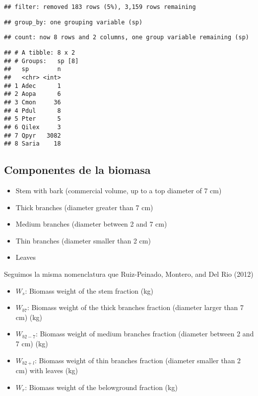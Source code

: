 \documentclass[]{article}
\newenvironment{Shaded}{\begin{snugshade}}{\end{snugshade}}
\newcommand{\KeywordTok}[1]{\textcolor[rgb]{0.13,0.29,0.53}{\textbf{#1}}}
\newcommand{\NormalTok}[1]{#1}
\newcommand{\OperatorTok}[1]{\textcolor[rgb]{0.81,0.36,0.00}{\textbf{#1}}}
\newcommand{\StringTok}[1]{\textcolor[rgb]{0.31,0.60,0.02}{#1}}
\providecommand{\tightlist}{%
  \setlength{\itemsep}{0pt}\setlength{\parskip}{0pt}}
\begin{document}
\begin{verbatim}
## filter: removed 183 rows (5%), 3,159 rows remaining
\end{verbatim}

\begin{Shaded}
\end{Shaded}

\begin{verbatim}
## group_by: one grouping variable (sp)
\end{verbatim}

\begin{verbatim}
## count: now 8 rows and 2 columns, one group variable remaining (sp)
\end{verbatim}

\begin{verbatim}
## # A tibble: 8 x 2
## # Groups:   sp [8]
##   sp        n
##   <chr> <int>
## 1 Adec      1
## 2 Aopa      6
## 3 Cmon     36
## 4 Pdul      8
## 5 Pter      5
## 6 Qilex     3
## 7 Qpyr   3082
## 8 Saria    18
\end{verbatim}

\hypertarget{componentes-de-la-biomasa}{%
\subsection{Componentes de la biomasa}\label{componentes-de-la-biomasa}}

\begin{itemize}
\tightlist
\item
  Stem with bark (commercial volume, up to a top diameter of 7 cm)
\item
  Thick branches (diameter greater than 7 cm)
\item
  Medium branches (diameter between 2 and 7 cm)
\item
  Thin branches (diameter smaller than 2 cm)
\item
  Leaves
\end{itemize}

Seguimos la misma nomenclatura que Ruiz-Peinado, Montero, and Del Rio
(2012)

\begin{itemize}
\tightlist
\item
  \(W_{s}\): Biomass weight of the stem fraction (kg)
\item
  \(W_{b7}\): Biomass weight of the thick branches fraction (diameter
  larger than 7 cm) (kg)
\item
  \(W_{b2-7}\): Biomass weight of medium branches fraction (diameter
  between 2 and 7 cm) (kg)
\item
  \(W_{b2+l}\): Biomass weight of thin branches fraction (diameter
  smaller than 2 cm) with leaves (kg)
\item
  \(W_{r}\): Biomass weight of the belowground fraction (kg)
\end{itemize}
\end{document}

